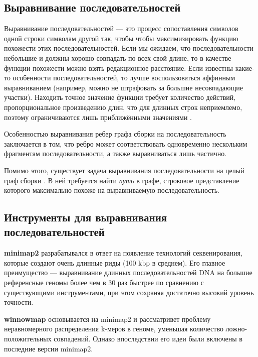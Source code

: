 \documentclass[14pt]{matmex-diploma-custom}
\begin{document}
\subsection{Выравнивание последовательностей}
Выравнивание последовательностей --- это процесс сопоставления символов одной строки символам другой так, чтобы чтобы максимизировать функцию похожести этих последовательностей. Если мы ожидаем, что последовательности небольшие и должны хорошо совпадать по всех свой длине, то в качестве функции похожести можно взять редакционное расстояние. Если известны какие-то особенности последовательностей, то лучше воспользоваться аффинным выравниванием (например, можно не штрафовать за большие несовпадающие участки). Находить точное значение функции требует количество действий, пропорциональное произведению длин, что для длинных строк неприемлемо, поэтому ограничиваются лишь приближёнными значениями \cite{art:likic2008needleman}.

Особенностью выравнивания ребер графа сборки на последовательность заключается в том, что ребро может соответствовать одновременно нескольким фрагментам последовательности, а также выравниваться лишь частично.

Помимо этого, существует задача выравнивания последовательности на целый граф сборки \cite{art:spaligner, art:rautiainen2020graphaligner}. В ней требуется найти \textit{путь} в графе, строковое представление которого максимально похоже на выравниваемую последовательность. 

\subsection{Инструменты для выравнивания последовательностей }



\textbf{minimap2} \cite{art:minimap2} разрабатывался в ответ на появление технологий секвенирования, которые создают очень длинные риды (100 kbp в среднем). Его главное преимущество --- выравнивание длинных последовательностей DNA на большие референсные геномы более чем в 30 раз быстрее \cite{art:minimap2} по сравнению с существующими инструментами, при этом сохраняя достаточно высокий уровень точности.

\textbf{winnowmap} \cite{art:winnowmap} основывается на minimap2 и рассматривет проблему неравномерного распределения k-меров в геноме, уменьшая количество ложно-положительных совпадений. Однако впоследствии его идеи были включены в последние версии minimap2.
\end{document}
